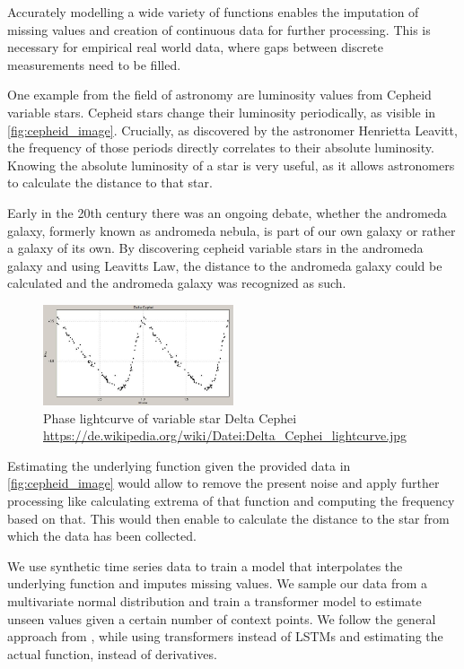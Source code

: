 Accurately modelling a wide variety of functions enables the imputation of missing values and creation of continuous data for further processing. This is necessary for empirical real world data, where gaps between discrete measurements need to be filled.

One example from the field of astronomy are luminosity values from Cepheid variable stars. Cepheid stars change their luminosity periodically, as visible in \autoref{fig:cepheid_image}. Crucially, as discovered by the astronomer Henrietta Leavitt, the frequency of those periods directly correlates to their absolute luminosity. Knowing the absolute luminosity of a star is very useful, as it allows astronomers to calculate the distance to that star.

Early in the 20th century there was an ongoing debate, whether the andromeda galaxy, formerly known as andromeda nebula, is part of our own galaxy or rather a galaxy of its own. By discovering cepheid variable stars in the andromeda galaxy and using Leavitts Law, the distance to the andromeda galaxy could be calculated and the andromeda galaxy was recognized as such. \cite{gaßnerAstroBook}

\begin{figure}[h]
	\centering
	\includegraphics[width = 0.5\textwidth]{figures/Cephei}
	\caption{Phase lightcurve of variable star Delta Cephei \tiny\url{ https://de.wikipedia.org/wiki/Datei:Delta_Cephei_lightcurve.jpg}}
	\label{fig:cepheid_image}
\end{figure}

Estimating the underlying function given the provided data in \autoref{fig:cepheid_image} would allow to remove the present noise and apply further processing like calculating extrema of that function and computing the frequency based on that. This would then enable to calculate the distance to the star from which the data has been collected.

We use synthetic time series data to train a model that interpolates the underlying function and imputes missing values. We sample our data from a multivariate normal distribution and train a transformer model to estimate unseen values given a certain number of context points. We follow the general approach from \citet{seifner2025zeroshotimputationfoundationinference}, while using transformers instead of LSTMs and estimating the actual function, instead of derivatives.